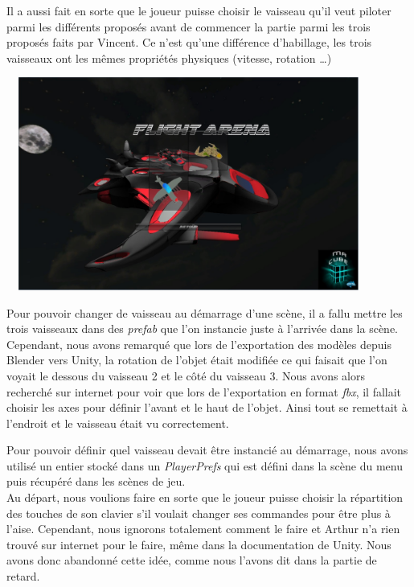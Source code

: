 \documentclass[10pt, titlepage]{report}
\begin{document}
Il a aussi fait en sorte que le joueur puisse choisir le vaisseau qu'il veut piloter parmi les différents proposés avant de commencer la partie parmi les trois proposés faits par Vincent. Ce n'est qu'une différence d'habillage, les trois vaisseaux ont les mêmes propriétés physiques (vitesse, rotation \dots )\\

\begin{center}
\includegraphics[height=7cm, width=12cm]{menu_selection.jpg}
\end{center}

Pour pouvoir changer de vaisseau au démarrage d'une scène, il a fallu mettre les trois vaisseaux dans des \textit{prefab} que l'on instancie juste à l'arrivée dans la scène. Cependant, nous avons remarqué que lors de l'exportation des modèles depuis Blender vers Unity, la rotation de l'objet était modifiée ce qui faisait que l'on voyait le dessous du vaisseau 2 et le côté du vaisseau 3. Nous avons alors recherché sur internet pour voir que lors de l'exportation en format \textit{fbx}, il fallait choisir les axes pour définir l'avant et le haut de l'objet. Ainsi tout se remettait à l'endroit et le vaisseau était vu correctement.

Pour pouvoir définir quel vaisseau devait être instancié au démarrage, nous avons utilisé un entier stocké dans un \textit{PlayerPrefs} qui est défini dans la scène du menu puis récupéré dans les scènes de jeu.\\

Au départ, nous voulions faire en sorte que le joueur puisse choisir la répartition des touches de son clavier s'il voulait changer ses commandes pour être plus à l'aise. Cependant, nous ignorons totalement comment le faire et Arthur n'a rien trouvé sur internet pour le faire, même dans la documentation de Unity. Nous avons donc abandonné cette idée, comme nous l'avons dit dans la partie de retard.\\
\end{document}
